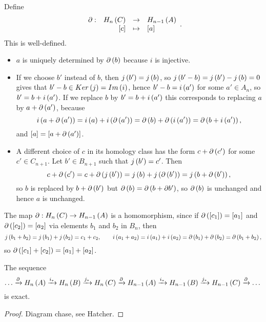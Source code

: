 Define
$$ \function[\partial]{H_n\rb{C}}{H_{n - 1}\rb{A}}{\sb{c}}{\sb{a}}. $$
This is well-defined.
\begin{itemize}
\item $ a $ is uniquely determined by $ \partial\left( b \right) $ because $ i $ is injective.
\item If we choose $ b' $ instead of $ b $, then $ j\left( b' \right) = j\left( b \right) $, so $ j\left( b' - b \right) = j\left( b' \right) - j\left( b \right) = 0 $ gives that $ b' - b \in Ker\left( j \right) = Im\left( i \right) $, hence $ b' - b = i\left( a' \right) $ for some $ a' \in A_n $, so $ b' = b + i\left( a' \right) $. If we replace $ b $ by $ b' = b + i\left( a' \right) $ this corresponds to replacing $ a $ by $ a + \partial\left( a' \right) $, because
$$ i\left( a + \partial\left( a' \right) \right) = i\left( a \right) + i\left( \partial\left( a' \right) \right) = \partial\left( b \right) + \partial\left( i\left( a' \right) \right) = \partial\left( b + i\left( a' \right) \right), $$
and $ \left[ a \right] = \left[ a + \partial\left( a' \right) \right] $.
\item A different choice of $ c $ in its homology class has the form $ c + \partial\left( c' \right) $ for some $ c' \in C_{n + 1} $. Let $ b' \in B_{n + 1} $ such that $ j\left( b' \right) = c' $. Then
$$ c + \partial\left( c' \right) = c + \partial\left( j\left( b' \right) \right) = j\left( b \right) + j\left( \partial\left( b' \right) \right) = j\left( b + \partial\left( b' \right) \right), $$
so $ b $ is replaced by $ b + \partial\left( b' \right) $ but $ \partial\left( b \right) = \partial\left( b + \partial b' \right) $, so $ \partial\left( b \right) $ is unchanged and hence $ a $ is unchanged.
\end{itemize}
The map $ \partial : H_n\left( C \right) \to H_{n - 1}\left( A \right) $ is a homomorphism, since if $ \partial\left( \left[ c_1 \right] \right) = \left[ a_1 \right] $ and $ \partial\left( \left[ c_2 \right] \right) = \left[ a_2 \right] $ via elements $ b_1 $ and $ b_2 $ in $ B_n $, then
$$ j\left( b_1 + b_2 \right) = j\left( b_1 \right) + j\left( b_2 \right) = c_1 + c_2, \qquad i\left( a_1 + a_2 \right) = i\left( a_1 \right) + i\left( a_2 \right) = \partial\left( b_1 \right) + \partial\left( b_2 \right) = \partial\left( b_1 + b_2 \right), $$
so $ \partial\left( \left[ c_1 \right] + \left[ c_2 \right] \right) = \left[ a_1 \right] + \left[ a_2 \right] $.

\begin{theorem}
The sequence
$$ \dots \xrightarrow{\partial} H_n\left( A \right) \xrightarrow{i_*} H_n\left( B \right) \xrightarrow{j_*} H_n\left( C \right) \xrightarrow{\partial} H_{n - 1}\left( A \right) \xrightarrow{i_*} H_{n - 1}\left( B \right) \xrightarrow{j_*} H_{n - 1}\left( C \right) \xrightarrow{\partial} \dots $$
is exact.
\end{theorem}

\begin{proof}
Diagram chase, see Hatcher.
\end{proof}

